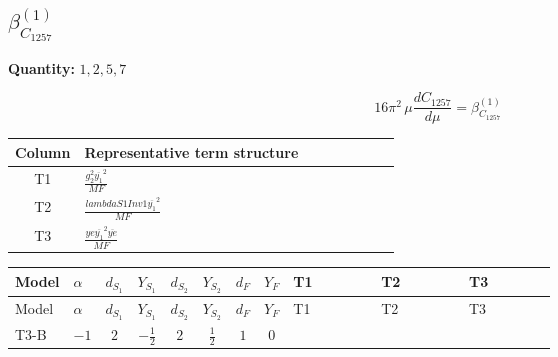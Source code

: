 \documentclass[8pt]{article}
\begin{document}
\begin{landscape}
\section*{$\beta_{C_{1257}}^{(1)}$}
\noindent\textbf{Quantity: }$\mathrm{1,2,5,7}$\par\smallskip
\[16\pi^2\,\mu\frac{d C_{1257}}{d\mu}=\beta_{C_{1257}}^{(1)}\]
\begin{center}
\begin{tabular}{@{}c >{\raggedright\arraybackslash}p{0.82\linewidth}@{}}
\toprule
Column & Representative term structure \\
\midrule
T1 & \(\displaystyle \frac{g_{2}^{2} \overline{y_{1}}^{2}}{MF}\) \\
\midrule
T2 & \(\displaystyle \frac{lambdaS1Inv1 \overline{y_{1}}^{2}}{MF}\) \\
\midrule
T3 & \(\displaystyle \frac{ye \overline{y_{1}}^{2} \overline{ye}}{MF}\) \\
\midrule
\bottomrule
\end{tabular}
\end{center}
\smallskip
\tiny
\begin{longtable}{@{}llcccccc >{\raggedright\arraybackslash}p{0.21\linewidth} >{\raggedright\arraybackslash}p{0.21\linewidth} >{\raggedright\arraybackslash}p{0.21\linewidth}@{}}
\toprule
Model & $\alpha$ & $d_{S_1}$ & $Y_{S_1}$ & $d_{S_2}$ & $Y_{S_2}$ & $d_F$ & $Y_F$ & T1 & T2 & T3 \\
\midrule
\endfirsthead
\toprule
Model & $\alpha$ & $d_{S_1}$ & $Y_{S_1}$ & $d_{S_2}$ & $Y_{S_2}$ & $d_F$ & $Y_F$ & T1 & T2 & T3 \\
\midrule
\endhead
T3-B & $-1$ & $2$ & $-\frac{1}{2}$ & $2$ & $\frac{1}{2}$ & $1$ & $0$ & \scriptsize\adjustbox{max width=\linewidth}{$\begin{gathered} - \frac{3 g_{2}^{2} \overline{y_{1}}^{2}}{8 MF}\end{gathered}$} & \scriptsize\adjustbox{max width=\linewidth}{$\begin{gathered} - \frac{lambdaS1Inv1 \overline{y_{1}}^{2}}{4 MF}\end{gathered}$} & \scriptsize\adjustbox{max width=\linewidth}{$\begin{gathered} \frac{ye \overline{y_{1}}^{2} \overline{ye}}{8 MF}\end{gathered}$} \\
\midrule
\bottomrule
\end{longtable}
\clearpage

\end{landscape}
\end{document}
